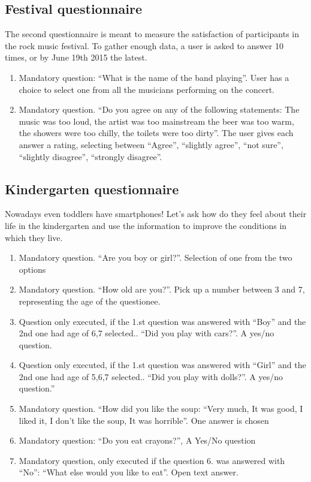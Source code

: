 \subsection{Festival questionnaire}
The second questionnaire is meant to measure the satisfaction of participants in the rock music festival. To gather enough data, a user is asked to answer 10 times, or by June 19th 2015 the latest.
\begin{enumerate}
\item Mandatory question: ``What is the name of the band playing''. User has a choice to select one from all the musicians performing on the concert.
\item Mandatory question. ``Do you agree on any of the following statements: The music was too loud, the artist was too mainstream the beer was too warm, the showers were too chilly, the toilets were too dirty''. The user gives each answer a rating, selecting between ``Agree'', ``slightly agree'', ``not sure'', ``slightly disagree'', ``strongly disagree''.
\end{enumerate}

\subsection{Kindergarten questionnaire}
Nowadays even toddlers have smartphones! Let's ask how do they feel about their life in the kindergarten and use the information to improve the conditions in which they live.
\begin{enumerate}
  \item Mandatory question. ``Are you boy or girl?''. Selection of one from the two options
  \item Mandatory question. ``How old are you?''. Pick up a number between 3 and 7, representing the age of the questionee.
  \item Question only executed, if the 1.st question was answered with ``Boy'' and the 2nd one had age of 6,7 selected.. ``Did you play with cars?''. A yes/no question.
  \item Question only executed, if the 1.st question was answered with ``Girl'' and the 2nd one had age of 5,6,7 selected.. ``Did you play with dolls?''. A yes/no question.''
  \item Mandatory question. ``How did you like the soup: ``Very much, It was good, I liked it, I don't like the soup, It was horrible''. One answer is chosen
  \item Mandatory question: ``Do you eat crayons?'', A Yes/No question
  \item Mandatory question, only executed if the question 6. was answered with ``No'': ``What else would you like to eat''. Open text answer.
\end{enumerate}
